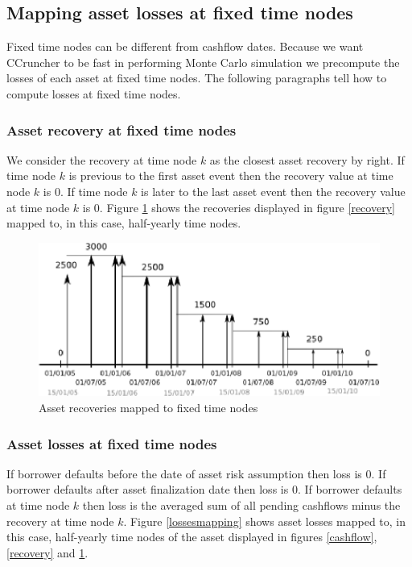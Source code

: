 \documentclass[a4paper,12pt,final]{article}
\begin{document}
\subsection{Mapping asset losses at fixed time nodes}
Fixed time nodes can be different from cashflow dates. Because we want CCruncher 
to be fast in performing Monte Carlo simulation we precompute the losses of each 
asset at fixed time nodes. The following paragraphs tell how to compute losses at 
fixed time nodes.

\subsubsection{Asset recovery at fixed time nodes}
We consider the recovery at time node $k$ as the closest asset recovery by 
right. If time node $k$ is previous to the first asset event then the recovery 
value at time node $k$ is $0$. If time node $k$ is later to the last asset event 
then the recovery value at time node $k$ is $0$. Figure \ref{recoverymapping} 
shows the recoveries displayed in figure \ref{recovery} mapped to, in this case,
half-yearly time nodes.

\begin{figure}[!hbtp]
\begin{center}
\includegraphics[width=12cm, angle=0]{./images/recoverymapping.eps}
\caption{Asset recoveries mapped to fixed time nodes}
\label{recoverymapping}
\end{center}
\end{figure}
\FloatBarrier

\subsubsection{Asset losses at fixed time nodes}
If borrower defaults before the date of asset risk assumption then loss is $0$.
If borrower defaults after asset finalization date then loss is $0$. 
If borrower defaults at time node $k$ then loss is the averaged sum of all 
pending cashflows minus the recovery at time node $k$.
Figure \ref{lossesmapping} shows asset losses mapped to, in this case, half-yearly 
time nodes of the asset displayed in figures \ref{cashflow}, \ref{recovery} and 
\ref{recoverymapping}.
\end{document}
